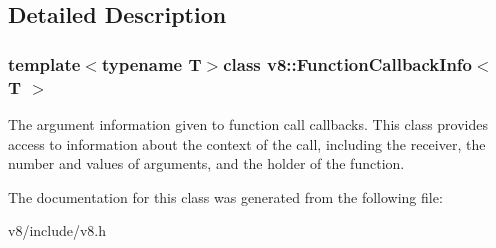\subsection{Detailed Description}
\subsubsection*{template$<$typename T$>$class v8\+::\+Function\+Callback\+Info$<$ T $>$}

The argument information given to function call callbacks. This class provides access to information about the context of the call, including the receiver, the number and values of arguments, and the holder of the function. 

The documentation for this class was generated from the following file\+:\begin{DoxyCompactItemize}
\item 
v8/include/v8.\+h\end{DoxyCompactItemize}
